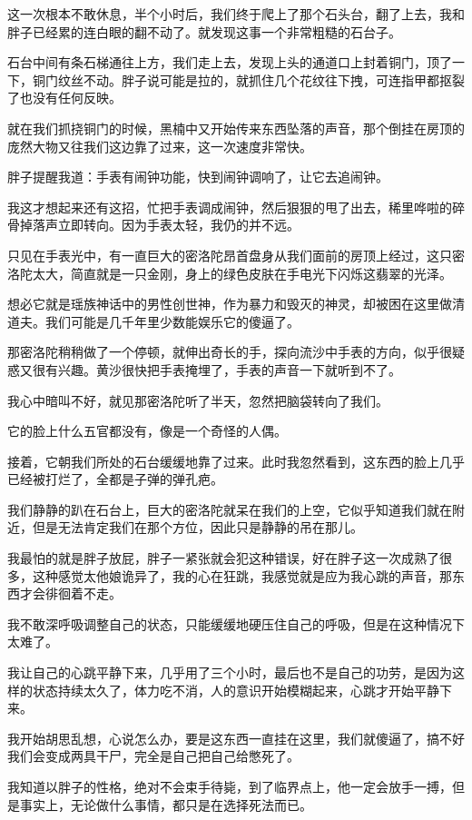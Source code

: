 这一次根本不敢休息，半个小时后，我们终于爬上了那个石头台，翻了上去，我和胖子已经累的连白眼的翻不动了。就发现这事一个非常粗糙的石台子。

石台中间有条石梯通往上方，我们走上去，发现上头的通道口上封着铜门，顶了一下，铜门纹丝不动。胖子说可能是拉的，就抓住几个花纹往下拽，可连指甲都抠裂了也没有任何反映。

就在我们抓挠铜门的时候，黑楠中又开始传来东西坠落的声音，那个倒挂在房顶的庞然大物又往我们这边靠了过来，这一次速度非常快。

胖子提醒我道：手表有闹钟功能，快到闹钟调响了，让它去追闹钟。

我这才想起来还有这招，忙把手表调成闹钟，然后狠狠的甩了出去，稀里哗啦的碎骨掉落声立即转向。因为手表太轻，我仍的并不远。

只见在手表光中，有一直巨大的密洛陀昂首盘身从我们面前的房顶上经过，这只密洛陀太大，简直就是一只金刚，身上的绿色皮肤在手电光下闪烁这翡翠的光泽。

想必它就是瑶族神话中的男性创世神，作为暴力和毁灭的神灵，却被困在这里做清道夫。我们可能是几千年里少数能娱乐它的傻逼了。

那密洛陀稍稍做了一个停顿，就伸出奇长的手，探向流沙中手表的方向，似乎很疑惑又很有兴趣。黄沙很快把手表掩埋了，手表的声音一下就听到不了。

我心中暗叫不好，就见那密洛陀听了半天，忽然把脑袋转向了我们。

它的脸上什么五官都没有，像是一个奇怪的人偶。

接着，它朝我们所处的石台缓缓地靠了过来。此时我忽然看到，这东西的脸上几乎已经被打烂了，全都是子弹的弹孔疤。

我们静静的趴在石台上，巨大的密洛陀就呆在我们的上空，它似乎知道我们就在附近，但是无法肯定我们在那个方位，因此只是静静的吊在那儿。

我最怕的就是胖子放屁，胖子一紧张就会犯这种错误，好在胖子这一次成熟了很多，这种感觉太他娘诡异了，我的心在狂跳，我感觉就是应为我心跳的声音，那东西才会徘徊着不走。

我不敢深呼吸调整自己的状态，只能缓缓地硬压住自己的呼吸，但是在这种情况下太难了。

我让自己的心跳平静下来，几乎用了三个小时，最后也不是自己的功劳，是因为这样的状态持续太久了，体力吃不消，人的意识开始模糊起来，心跳才开始平静下来。

我开始胡思乱想，心说怎么办，要是这东西一直挂在这里，我们就傻逼了，搞不好我们会变成两具干尸，完全是自己把自己给憋死了。

我知道以胖子的性格，绝对不会束手待毙，到了临界点上，他一定会放手一搏，但是事实上，无论做什么事情，都只是在选择死法而已。


